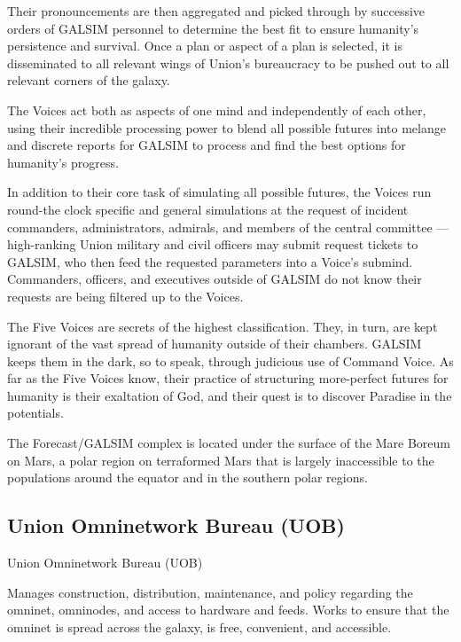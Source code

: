Their pronouncements are then aggregated and picked through by successive orders of GALSIM  
personnel to determine the best fit to ensure humanity’s persistence and survival. Once a plan or  
aspect of a plan is selected, it is disseminated to all relevant wings of Union’s bureaucracy to be  
pushed out to all relevant corners of the galaxy.   
 

The Voices act both as aspects of one mind and independently of each other, using their  
incredible processing power to blend all possible futures into melange and discrete reports for  
GALSIM to process and find the best options for humanity’s progress. 
 

                                                                                                          


In addition to their core task of simulating all possible futures, the Voices run round-the clock  
specific and general simulations at the request of incident commanders, administrators,  
admirals, and members of the central committee — high-ranking Union military and civil officers  
may submit request tickets to GALSIM, who then feed the requested parameters into a Voice’s  
submind. Commanders, officers, and executives outside of GALSIM do not know their requests  
are being filtered up to the Voices. 
 

The Five Voices are secrets of the highest classification. They, in turn, are kept ignorant of the  
vast spread of humanity outside of their chambers. GALSIM keeps them in the dark, so to speak,  
through judicious use of Command Voice. As far as the Five Voices know, their practice of  
structuring more-perfect futures for humanity is their exaltation of God, and their quest is to  
discover Paradise in the potentials. 
 

The Forecast/GALSIM complex is located under the surface of the Mare Boreum on Mars, a  
polar region on terraformed Mars that is largely inaccessible to the populations around the  
equator and in the southern polar regions.  
 
\subsection{Union Omninetwork Bureau (UOB)}
Union Omninetwork Bureau (UOB)   

Manages construction, distribution, maintenance, and policy regarding the omninet, omninodes,  
and access to hardware and feeds. Works to ensure that the omninet is spread across the  
galaxy, is free, convenient, and accessible. 
 
